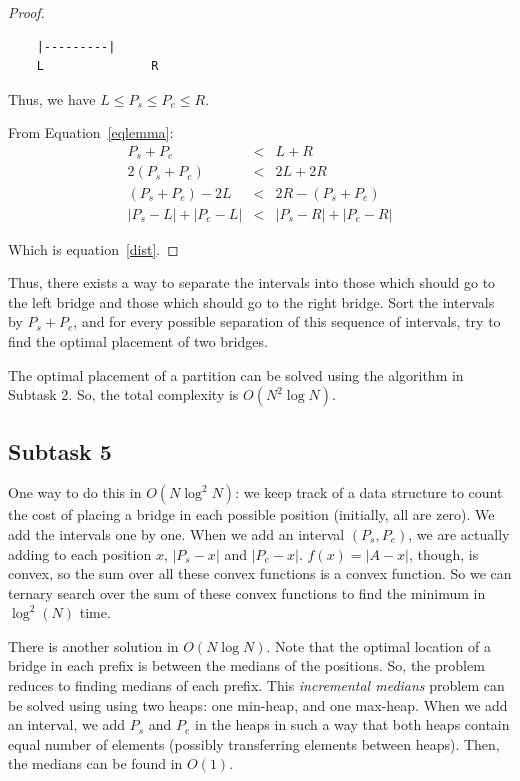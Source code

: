 \documentclass[a4paper]{article}
\begin{document}
\begin{proof}
	\begin{verbatim}
	|---------|
	L               R
	\end{verbatim}
	
	Thus, we have $L \le P_s \le P_e \le R$.
	
	From Equation~\ref{eqlemma}:
	\begin{eqnarray*}
		P_s + P_e &<& L + R \\
		2(P_s + P_e) &<& 2L + 2R \\
		(P_s + P_e) - 2L &<& 2R - (P_s + P_e) \\
		|P_s - L| + |P_e - L| &<& |P_s - R| + |P_e - R|
	\end{eqnarray*}
	
	Which is equation~\ref{dist}.
	
\end{proof}

Thus, there exists a way to separate the intervals into those which should
go to the left bridge and those which should go to the right bridge. Sort the intervals by $P_s + P_e$, and for every possible separation of this sequence of intervals, try to find the optimal placement of two bridges.

The optimal placement of a partition can be solved using the algorithm in Subtask 2. So, the total complexity is $O(N^2 \log N)$.

\subsection*{Subtask 5}

One way to do this in $O(N \log^2 N)$: we keep track of a data structure to count the cost of placing a bridge in each possible position (initially, all are zero). We add the intervals one by one. When we add an interval $(P_s, P_e)$, we are actually adding to each position $x$, $|P_s - x|$ and $|P_e - x|$. $f(x) = |A - x|$, though, is convex, so the sum over all these convex functions is a convex function. So we can ternary search over the sum of these convex functions to find the minimum in $\log^2 (N)$ time.

There is another solution in $O(N \log N)$. Note that the optimal location of a bridge in each prefix is between the medians of the positions. So, the problem reduces to finding medians of each prefix. This \textit{incremental medians} problem can be solved using using two heaps: one min-heap, and one max-heap. When we add an interval, we add $P_s$ and $P_e$ in the heaps in such a way that both heaps contain equal number of elements (possibly transferring elements between heaps). Then, the medians can be found in $O(1)$.
\end{document}
